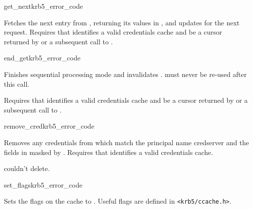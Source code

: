 \begin{funcdecl}{get_next}{krb5_error_code}{\funcin}
\funcout
{}
\funcinout
{}
\end{funcdecl}

Fetches the next entry from , returning its values in
, and updates  for the next request.
Requires that  identifies a valid credentials cache and
 be a cursor returned by
 or a subsequent call to
.


\begin{funcdecl}{end_get}{krb5_error_code}{\funcin}
\end{funcdecl}

Finishes sequential processing mode and invalidates .
 must never be re-used after this call.

Requires that  identifies a valid credentials cache and
 be a cursor returned by
 or a subsequent call to
.



\begin{funcdecl}{remove_cred}{krb5_error_code}{\funcin}
\end{funcdecl}

Removes any credentials from  which match the principal
name {cred{\ptsto}server} and the fields in  masked by
.
Requires that  identifies a valid credentials cache.

couldn't delete.

\begin{funcdecl}{set_flags}{krb5_error_code}{\funcin}
\end{funcdecl}

Sets the flags on the cache  to .  Useful
flags are defined in {\tt <krb5/ccache.h>}.


